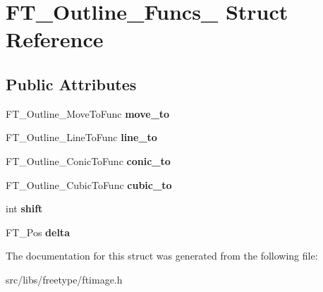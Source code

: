\hypertarget{struct_f_t___outline___funcs__}{
\section{FT\_\-Outline\_\-Funcs\_\- Struct Reference}
\label{struct_f_t___outline___funcs__}
}
\subsection*{Public Attributes}
\begin{DoxyCompactItemize}
\item 
\hypertarget{struct_f_t___outline___funcs___abd53463a59a1ae2c6998e619c2ab6a65}{
FT\_\-Outline\_\-MoveToFunc {\bfseries move\_\-to}}
\label{struct_f_t___outline___funcs___abd53463a59a1ae2c6998e619c2ab6a65}

\item 
\hypertarget{struct_f_t___outline___funcs___a876fc8ca7541786cd3c4ec3806f88360}{
FT\_\-Outline\_\-LineToFunc {\bfseries line\_\-to}}
\label{struct_f_t___outline___funcs___a876fc8ca7541786cd3c4ec3806f88360}

\item 
\hypertarget{struct_f_t___outline___funcs___a09681f5a64189066d3fba3cf398a135b}{
FT\_\-Outline\_\-ConicToFunc {\bfseries conic\_\-to}}
\label{struct_f_t___outline___funcs___a09681f5a64189066d3fba3cf398a135b}

\item 
\hypertarget{struct_f_t___outline___funcs___aa3e0c1bacb181a5f43c104ab7f72cfda}{
FT\_\-Outline\_\-CubicToFunc {\bfseries cubic\_\-to}}
\label{struct_f_t___outline___funcs___aa3e0c1bacb181a5f43c104ab7f72cfda}

\item 
\hypertarget{struct_f_t___outline___funcs___a540c246669b21b86cb405b3d9019cfda}{
int {\bfseries shift}}
\label{struct_f_t___outline___funcs___a540c246669b21b86cb405b3d9019cfda}

\item 
\hypertarget{struct_f_t___outline___funcs___a3c3121398b3ff564b4f3fd5b2a318e5e}{
FT\_\-Pos {\bfseries delta}}
\label{struct_f_t___outline___funcs___a3c3121398b3ff564b4f3fd5b2a318e5e}

\end{DoxyCompactItemize}


The documentation for this struct was generated from the following file:\begin{DoxyCompactItemize}
\item 
src/libs/freetype/ftimage.h\end{DoxyCompactItemize}
